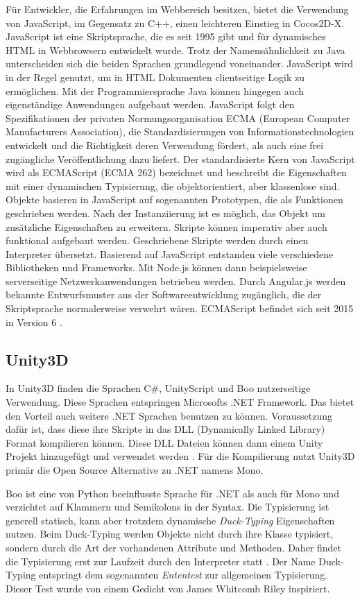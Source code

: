\bigskip
Für Entwickler, die Erfahrungen im Webbereich besitzen, bietet die Verwendung von JavaScript, im Gegensatz zu C++, einen leichteren Einstieg in Cocos2D-X.
JavaScript ist eine Skriptsprache, die es seit 1995 gibt und für dynamisches HTML in Webbrowsern entwickelt wurde. Trotz der Namensähnlichkeit zu Java unterscheiden sich die beiden Sprachen grundlegend voneinander. JavaScript wird in der Regel genutzt, um in HTML Dokumenten clientseitige Logik zu ermöglichen. Mit der Programmiersprache Java können hingegen auch eigenständige Anwendungen aufgebaut werden. JavaScript folgt den Spezifikationen der privaten Normungsorganisation ECMA (European Computer Manufacturers Association), die Standardisierungen von Informationstechnologien entwickelt und die Richtigkeit deren Verwendung fördert, als auch eine frei zugängliche Veröffentlichung dazu liefert. Der standardisierte Kern von JavaScript wird als ECMAScript (ECMA 262) bezeichnet und beschreibt die Eigenschaften mit einer dynamischen Typisierung, die objektorientiert, aber klassenlose sind. Objekte basieren in JavaScript auf sogenannten Prototypen, die als Funktionen geschrieben werden. Nach der Instanziierung ist es möglich, das Objekt um zusätzliche Eigenschaften zu erweitern. Skripte können imperativ aber auch funktional aufgebaut werden. Geschriebene Skripte werden durch einen Interpreter übersetzt. Basierend auf JavaScript entstanden viele verschiedene Bibliotheken und Frameworks. Mit Node.js können dann beispielsweise serverseitige Netzwerkanwendungen betrieben werden. Durch Angular.js werden bekannte Entwurfsmuster aus der Softwareentwicklung zugänglich, die der Skriptsprache normalerweise verwehrt wären. ECMAScript befindet sich seit 2015 in Version 6 \citep{learning_javascript}.
 

\subsection{Unity3D}
In Unity3D finden die Sprachen C\#, UnityScript und Boo nutzerseitige Verwendung. Diese Sprachen entspringen Microsofts .NET Framework. Das bietet den Vorteil auch weitere .NET Sprachen benutzen zu können. Voraussetzung dafür ist, dass diese ihre Skripte in das DLL (Dynamically Linked Library) Format kompilieren können. Diese DLL Dateien können dann einem Unity Projekt hinzugefügt und verwendet werden \citep{unity_managed_plugins}. Für die Kompilierung nutzt Unity3D primär die Open Source Alternative zu .NET namens Mono.

\bigskip
Boo ist eine von Python beeinflusste Sprache für .NET als auch für Mono und verzichtet auf Klammern und Semikolons in der Syntax. Die Typisierung ist generell statisch, kann aber trotzdem dynamische \textit{Duck-Typing} Eigenschaften nutzen. Beim Duck-Typing werden Objekte nicht durch ihre Klasse typisiert, sondern durch die Art der vorhandenen Attribute und Methoden. Daher findet die Typisierung erst zur Laufzeit durch den Interpreter statt \citep{boo_about}. Der Name Duck-Typing entspringt dem sogenannten \textit{Ententest} zur allgemeinen Typisierung. Dieser Test wurde von einem Gedicht von James Whitcomb Riley inspiriert.


